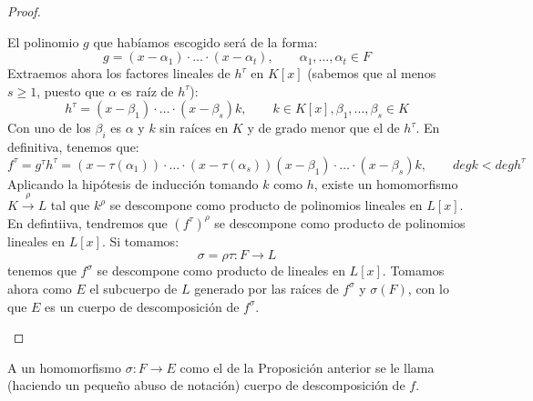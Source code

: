 \begin{prop}
\begin{proof}
\begin{itemize}
                El polinomio $g$ que habíamos escogido será de la forma:
                \begin{equation*}
                    g = (x-\alpha_1)\cdot  \ldots \cdot (x-\alpha_t), \qquad \alpha_1,\ldots,\alpha_t \in F
                \end{equation*}
                Extraemos ahora los factores lineales de $h^\tau$ en $K[x]$ (sabemos que al menos $s\geq 1$, puesto que $\alpha$ es raíz de $h^\tau$):
                \begin{equation*}
                    h^\tau = (x-\beta_1)\cdot \ldots\cdot (x-\beta_s)k, \qquad k\in K[x], \beta_1,\ldots,\beta_s\in K
                \end{equation*}
                Con uno de los $\beta_i$ es $\alpha$ y $k$ sin raíces en $K$ y de grado menor que el de $h^\tau$. En definitiva, tenemos que:
                \begin{equation*}
                    f^\tau = g^\tau h^\tau = (x-\tau(\alpha_1))\cdot  \ldots \cdot (x-\tau(\alpha_s))(x-\beta_1) \cdot \ldots \cdot (x-\beta_s)k, \qquad deg k < deg h^\tau
                \end{equation*}
                Aplicando la hipótesis de inducción tomando $k$ como $h$, existe un homomorfismo $K\stackrel{\rho}{\to}L$ tal que $k^\rho$  se descompone como producto de polinomios lineales en $L[x]$. En defintiiva, tendremos que ${(f^\tau)}^{\rho}$ se descompone como producto de polinomios lineales en $L[x]$. Si tomamos:
                \begin{equation*}
                    \sigma = \rho\tau : F\to L
                \end{equation*}
                tenemos que $f^\sigma$ se descompone como producto de lineales en $L[x]$. Tomamos ahora como $E$ el subcuerpo de $L$ generado por las raíces de $f^\sigma$ y $\sigma(F)$, con lo que $E$ es un cuerpo de descomposición de $f^\sigma$.
        \end{itemize}
    \end{proof}
\end{prop}


\begin{definicion}
    A un homomorfismo $\sigma:F\to E$ como el de la Proposición anterior se le llama (haciendo un pequeño abuso de notación) cuerpo de descomposición de $f$.
\end{definicion}

